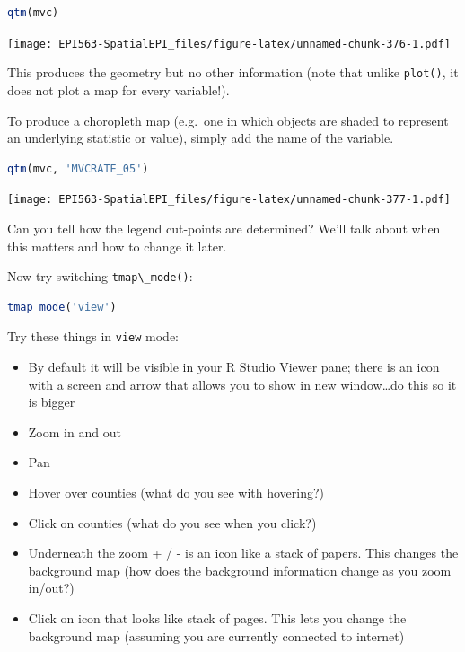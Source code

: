 \documentclass[
]{book}
\newcommand{\passthrough}[1]{#1}
\providecommand{\tightlist}{%
  \setlength{\itemsep}{0pt}\setlength{\parskip}{0pt}}
\begin{document}
\begin{lstlisting}[language=R]
qtm(mvc)
\end{lstlisting}

\texttt{[image: EPI563-SpatialEPI\_files/figure-latex/unnamed-chunk-376-1.pdf]}

This produces the geometry but no other information (note that unlike \passthrough{\lstinline!plot()!}, it does not plot a map for every variable!).

To produce a choropleth map (e.g.~one in which objects are shaded to represent an underlying statistic or value), simply add the name of the variable.

\begin{lstlisting}[language=R]
qtm(mvc, 'MVCRATE_05')
\end{lstlisting}

\texttt{[image: EPI563-SpatialEPI\_files/figure-latex/unnamed-chunk-377-1.pdf]}

Can you tell how the legend cut-points are determined? We'll talk about when this matters and how to change it later.

Now try switching \passthrough{\lstinline!tmap\_mode()!}:

\begin{lstlisting}[language=R]
tmap_mode('view')
\end{lstlisting}

Try these things in \passthrough{\lstinline!view!} mode:

\begin{itemize}
\tightlist
\item
  By default it will be visible in your R Studio Viewer pane; there is an icon with a screen and arrow that allows you to show in new window\ldots do this so it is bigger
\item
  Zoom in and out
\item
  Pan
\item
  Hover over counties (what do you see with hovering?)
\item
  Click on counties (what do you see when you click?)
\item
  Underneath the zoom + / - is an icon like a stack of papers. This changes the background map (how does the background information change as you zoom in/out?)
\item
  Click on icon that looks like stack of pages. This lets you change the background map (assuming you are currently connected to internet)
\end{itemize}
\end{document}
